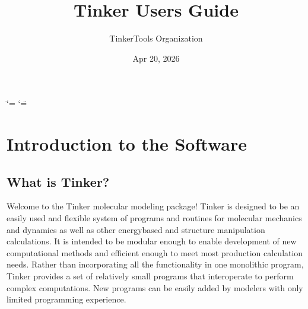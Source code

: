 \documentclass[letterpaper,11pt,english]{sphinxmanual}
\title{Tinker User\textquotesingle{}s Guide}
\date{Apr 20, 2026}
\author{TinkerTools Organization}
\begin{document}
\ifdefined\shorthandoff
  \ifnum\catcode`\=\string=\active\shorthandoff{=}\fi
  \ifnum\catcode`\"=\active{}\fi
\fi

\pagestyle{empty}
\sphinxmaketitle
\pagestyle{plain}
\sphinxtableofcontents
\pagestyle{normal}
\label{\detokenize{index::doc}}


\sphinxstepscope


\chapter{Introduction to the Software}
\label{\detokenize{text/introduction:introduction-to-the-software}}\label{\detokenize{text/introduction::doc}}

\section{What is Tinker?}
\label{\detokenize{text/introduction:what-is-tinker}}
\sphinxAtStartPar
Welcome to the Tinker molecular modeling package! Tinker is designed to be an easily used and flexible system of programs and routines for molecular mechanics and dynamics as well as other energy\sphinxhyphen{}based and structure manipulation calculations. It is intended to be modular enough to enable development of new computational methods and efficient enough to meet most production calculation needs. Rather than incorporating all the functionality in one monolithic program, Tinker provides a set of relatively small programs that interoperate to perform complex computations. New programs can be easily added by modelers with only limited programming experience.
\end{document}
